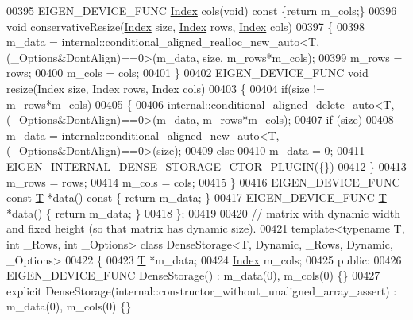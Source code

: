 \begin{DoxyCode}
00395     EIGEN\_DEVICE\_FUNC \hyperlink{namespace_eigen_a62e77e0933482dafde8fe197d9a2cfde}{Index} cols(\textcolor{keywordtype}{void})\textcolor{keyword}{ const }\{\textcolor{keywordflow}{return} m\_cols;\}
00396     \textcolor{keywordtype}{void} conservativeResize(\hyperlink{namespace_eigen_a62e77e0933482dafde8fe197d9a2cfde}{Index} size, \hyperlink{namespace_eigen_a62e77e0933482dafde8fe197d9a2cfde}{Index} rows, \hyperlink{namespace_eigen_a62e77e0933482dafde8fe197d9a2cfde}{Index} cols)
00397     \{
00398       m\_data = internal::conditional\_aligned\_realloc\_new\_auto<T,(\_Options&DontAlign)==0>(m\_data, size, 
      m\_rows*m\_cols);
00399       m\_rows = rows;
00400       m\_cols = cols;
00401     \}
00402     EIGEN\_DEVICE\_FUNC \textcolor{keywordtype}{void} resize(\hyperlink{namespace_eigen_a62e77e0933482dafde8fe197d9a2cfde}{Index} size, \hyperlink{namespace_eigen_a62e77e0933482dafde8fe197d9a2cfde}{Index} rows, \hyperlink{namespace_eigen_a62e77e0933482dafde8fe197d9a2cfde}{Index} cols)
00403     \{
00404       \textcolor{keywordflow}{if}(size != m\_rows*m\_cols)
00405       \{
00406         internal::conditional\_aligned\_delete\_auto<T,(\_Options&DontAlign)==0>(m\_data, m\_rows*m\_cols);
00407         \textcolor{keywordflow}{if} (size)
00408           m\_data = internal::conditional\_aligned\_new\_auto<T,(\_Options&DontAlign)==0>(size);
00409         \textcolor{keywordflow}{else}
00410           m\_data = 0;
00411         EIGEN\_INTERNAL\_DENSE\_STORAGE\_CTOR\_PLUGIN(\{\})
00412       \}
00413       m\_rows = rows;
00414       m\_cols = cols;
00415     \}
00416     EIGEN\_DEVICE\_FUNC \textcolor{keyword}{const} \hyperlink{group___sparse_core___module_class_eigen_1_1_triplet}{T} *data()\textcolor{keyword}{ const }\{ \textcolor{keywordflow}{return} m\_data; \}
00417     EIGEN\_DEVICE\_FUNC \hyperlink{group___sparse_core___module_class_eigen_1_1_triplet}{T} *data() \{ \textcolor{keywordflow}{return} m\_data; \}
00418 \};
00419 
00420 \textcolor{comment}{// matrix with dynamic width and fixed height (so that matrix has dynamic size).}
00421 \textcolor{keyword}{template}<\textcolor{keyword}{typename} T, \textcolor{keywordtype}{int} \_Rows, \textcolor{keywordtype}{int} \_Options> \textcolor{keyword}{class }DenseStorage<T, Dynamic, \_Rows, Dynamic, \_Options>
00422 \{
00423     \hyperlink{group___sparse_core___module_class_eigen_1_1_triplet}{T} *m\_data;
00424     \hyperlink{namespace_eigen_a62e77e0933482dafde8fe197d9a2cfde}{Index} m\_cols;
00425   \textcolor{keyword}{public}:
00426     EIGEN\_DEVICE\_FUNC DenseStorage() : m\_data(0), m\_cols(0) \{\}
00427     \textcolor{keyword}{explicit} DenseStorage(internal::constructor\_without\_unaligned\_array\_assert) : m\_data(0), m\_cols(0) \{\}

\end{DoxyCode}
